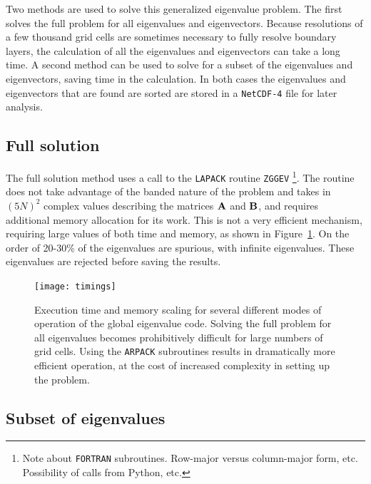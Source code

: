 \documentclass[letterpaper]{article}
\begin{document}
Two methods are used to solve this generalized eigenvalue problem. The
first solves the full problem for all eigenvalues and
eigenvectors. Because resolutions of a few thousand grid cells are
sometimes necessary to fully resolve boundary layers, the calculation
of all the eigenvalues and eigenvectors can take a long time. A second
method can be used to solve for a subset of the eigenvalues and
eigenvectors, saving time in the calculation. In both cases the
eigenvalues and eigenvectors that are found are sorted are stored in a
\texttt{NetCDF-4} file for later analysis.

\subsection{Full solution}

The full solution method uses a call to the \texttt{LAPACK} routine
\texttt{ZGGEV}
\footnote{Note about \texttt{FORTRAN} subroutines. Row-major versus
  column-major form, etc. Possibility of calls from Python, etc.}.
The routine does not take advantage of the banded nature of the
problem and takes in $(5N)^2$ complex values describing the matrices
${\bf A}$ and ${\bf B}$, and requires additional memory allocation for
its work. This is not a very efficient mechanism, requiring large
values of both time and memory, as shown in
Figure~\ref{fig:globalcode:timings}. On the order of 20-30\% of the
eigenvalues are spurious, with infinite eigenvalues. These eigenvalues
are rejected before saving the results.

\begin{figure}
\centering
\texttt{[image: timings]}
\caption[Execution time and memory scaling for global eigenvalue
  code]{Execution time and memory scaling for several different modes
  of operation of the global eigenvalue code. Solving the full problem
  for all eigenvalues becomes prohibitively difficult for large
  numbers of grid cells. Using the \texttt{ARPACK} subroutines results
  in dramatically more efficient operation, at the cost of increased
  complexity in setting up the problem.}
\label{fig:globalcode:timings}
\end{figure}

\subsection{Subset of eigenvalues}
\end{document}
